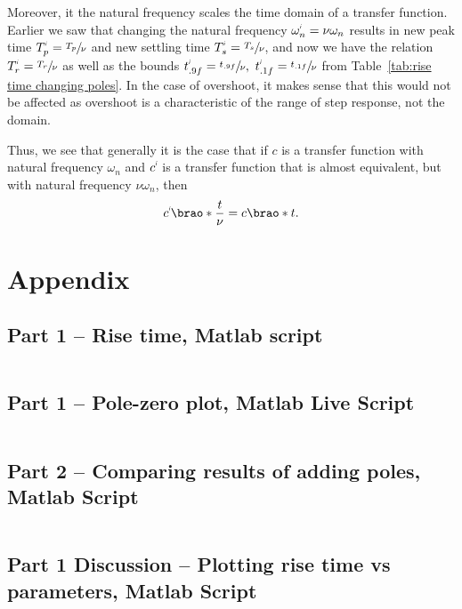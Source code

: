 \documentclass[12pt]{article}
\DeclarePairedDelimiter\brao()%
\newcommand{\setprime}[2][1]{%
    {#2}^{%
        \raisebox{1pt}{%
            \scalebox{0.5}{%
                \itshape\sffamily\uppercase%
                \expandafter{%
                    \romannumeral#1%
                }%
            }%
        }
    }%
}%
\begin{document}
Moreover, it the natural frequency
scales the time domain
of a transfer function.
Earlier we saw that changing the natural frequency $\setprime\omega_n = \nu\omega_n$ results in
new peak time $\setprime{T}_p = \sfrac{T_p}\nu$ and
new settling time $\setprime{T}_s = \sfrac{T_s}\nu$,
and now we have the relation $\setprime{T}_r = \sfrac{T_r}\nu$
as well as the bounds $\setprime{t}_{.9f} = \sfrac{t_{.9f}}\nu,\ \setprime{t}_{.1f} = \sfrac{t_{.1f}}\nu$
from Table~\ref{tab:rise time changing poles}.
In the case of overshoot, it makes sense that this would not be affected
as overshoot is a characteristic of the range of step response, not the domain.

Thus, we see that generally it is the case that if $c$ is a transfer function with natural frequency $\omega_n$
and $\setprime{c}$ is a transfer function that is almost equivalent, but with natural frequency $\nu\omega_n$,
then
\begin{equation}
    \setprime{c}\brao*{\frac{t}\nu} = c\brao*t.
\end{equation}

\newpage
\printbibliography

\newpage
\appendix
\section{Appendix}

\subsection{Part 1 -- Rise time, Matlab script}\label{sap:solving for .9cf and .1cf}
\inputminted{matlab}{src/part01a_rise_time.m}

\subsection{Part 1 -- Pole-zero plot, Matlab Live Script}\label{sap:pzplot}
\inputminted{matlab}{src/part01a_pzplot_mlx.m}

\subsection{Part 2 -- Comparing results of adding poles, Matlab Script}\label{sap:adding poles}
\inputminted{matlab}{src/part02_adding_poles.m}

\subsection{Part 1 Discussion -- Plotting rise time vs parameters, Matlab Script}\label{sap:rise time vs parameters}
\inputminted{matlab}{src/part01_rise_time_vs_parameters_plot.m}
\end{document}
